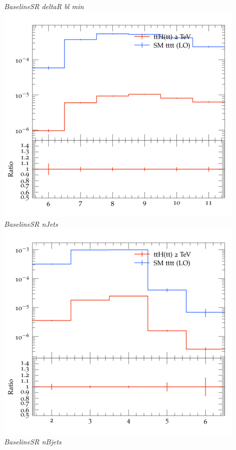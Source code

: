 \documentclass{beamer}
\begin{document}
\begin{frame}
\begin{columns}
\textit{\small BaselineSR deltaR bl min}
\includegraphics[width=\textwidth]{../plots/ttH_2000/tttt_ttH_1LOS/BaselineSR_nJets.png}\\
\textit{\small BaselineSR nJets}
\includegraphics[width=\textwidth]{../plots/ttH_2000/tttt_ttH_1LOS/BaselineSR_nBjets.png}\\
\textit{\small BaselineSR nBjets}
\end{columns}
\end{frame}
\end{document}
